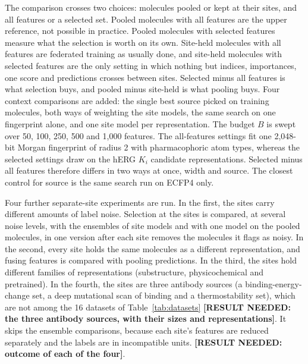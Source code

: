 The comparison crosses two choices: molecules pooled or kept at their sites, and all features or a selected set. Pooled molecules with all features are the upper reference, not possible in practice. Pooled molecules with selected features measure what the selection is worth on its own. Site-held molecules with all features are federated training as usually done, and site-held molecules with selected features are the only setting in which nothing but indices, importances, one score and predictions crosses between sites. Selected minus all features is what selection buys, and pooled minus site-held is what pooling buys. Four context comparisons are added: the single best source picked on training molecules, both ways of weighting the site models, the same search on one fingerprint alone, and one site model per representation. The budget $B$ is swept over 50, 100, 250, 500 and 1,000 features. The all-features settings fit one 2,048-bit Morgan fingerprint of radius 2 with pharmacophoric atom types, whereas the selected settings draw on the hERG $K_i$ candidate representations. Selected minus all features therefore differs in two ways at once, width and source. The closest control for source is the same search run on ECFP4 only.

Four further separate-site experiments are run. In the first, the sites carry different amounts of label noise. Selection at the sites is compared, at several noise levels, with the ensembles of site models and with one model on the pooled molecules, in one version after each site removes the molecules it flags as noisy. In the second, every site holds the same molecules as a different representation, and fusing features is compared with pooling predictions. In the third, the sites hold different families of representations (substructure, physicochemical and pretrained). In the fourth, the sites are three antibody sources (a binding-energy-change set, a deep mutational scan of binding and a thermostability set), which are not among the 16 datasets of Table~\ref{tab:datasets} \textbf{[RESULT NEEDED: the three antibody sources, with their sizes and representations]}. It skips the ensemble comparisons, because each site's features are reduced separately and the labels are in incompatible units. \textbf{[RESULT NEEDED: outcome of each of the four]}.

